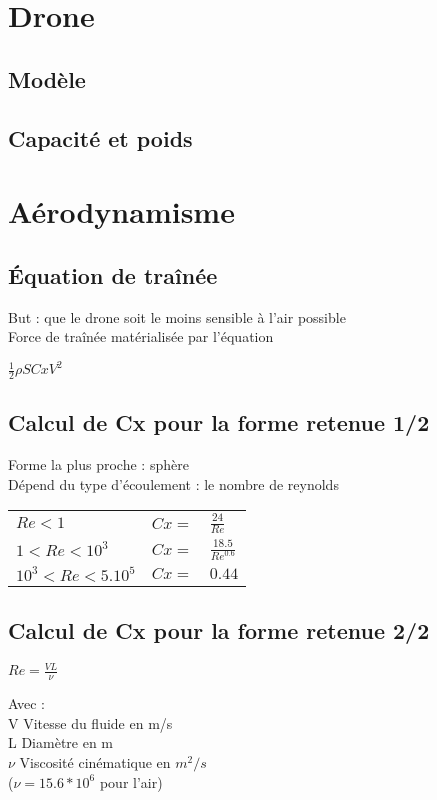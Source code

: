 \documentclass{beamer}
\begin{document}
\section{Drone}

\subsection{Modèle}
\subsection{Capacité et poids}

\section{Aérodynamisme}

\subsection{Équation de traînée}
\begin{frame}
 But : que le drone soit le moins sensible à l'air possible \\
 Force de traînée matérialisée par l'équation \\
 \begin{center}
  $\frac12 \rho S Cx V^2$
 \end{center}
\end{frame}

\subsection{Calcul de Cx pour la forme retenue 1/2}
\begin{frame}
 Forme la plus proche : sphère \\
 Dépend du type d'écoulement : le nombre de reynolds \\
 \begin{center}
  \begin{tabular}{lll}
   $Re < 1$ & $Cx = $ & $\frac{24}{Re}$ \\
   $1 < Re < 10^3$ & $Cx = $ & $\frac{18.5}{Re^0.6}$ \\
   $10^3 < Re < 5.10^5$ & $Cx = $ & $0.44$
  \end{tabular}
 \end{center}
\end{frame}

\subsection{Calcul de Cx pour la forme retenue 2/2}
\begin{frame}
 \begin{center}
  $Re = \frac{VL}{\nu}$
 \end{center}
 Avec : \\
 V Vitesse du fluide en m/s \\
 L Diamètre en m \\
 $\nu$ Viscosité cinématique en $m^2/s$ \\
 ($\nu = 15.6*10^6$ pour l'air)
\end{frame}
\end{document}
